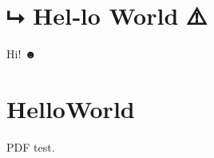 \documentclass{article}%
\begin{document}
\section{⮡ Hel‑lo World ⚠}

Hi! ☻

\makeatletter%
\section{\unicodepointsUni@tarentPfeil{} Hel\unicodepoints@nbdash{}lo\underbar{}World \unicodepoints@warn{}}
\makeatother%

 PDF test.
\end{document}
